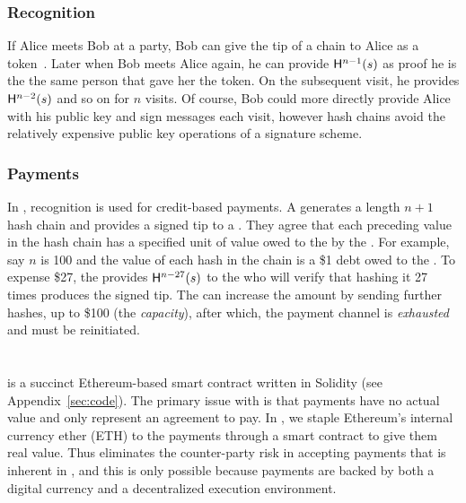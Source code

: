 \subsubsection{Recognition}

 If Alice meets Bob at a party, Bob can give the tip of a chain to Alice as a token~\cite{ABC+98}. Later when Bob meets Alice again, he can provide $\mathsf{H}^{n-1}(s)$ as proof he is the the same person that gave her the token. On the subsequent visit, he provides $\mathsf{H}^{n-2}(s)$ and so on for $n$ visits. Of course, Bob could more directly provide Alice with his public key and sign messages each visit, however hash chains avoid the relatively expensive public key operations of a signature scheme.

\subsubsection{Payments}

In \pw, recognition is used for credit-based payments. A \make generates a length $n+1$ hash chain and provides a signed tip to a \take. They agree that each preceding value in the hash chain has a specified unit of value owed to the \take by the \make. For example, say $n$ is 100 and the value of each hash in the chain is a \$1 debt owed to the \take. To expense \$27, the \make provides $\mathsf{H}^{n-27}(s)$ to the \take who will verify that hashing it 27 times produces the signed tip. The \make can increase the amount by sending further hashes, up to \$100 (the \textit{capacity}), after which, the payment channel is \textit{exhausted} and must be reinitiated.


\section{\ew}

\ew is a succinct Ethereum-based smart contract written in Solidity (see Appendix~\ref{sec:code}). The primary issue with \pw is that payments have no actual value and only represent an agreement to pay. In \ew, we staple Ethereum's internal currency ether (ETH) to the payments through a smart contract to give them real value. Thus \ew eliminates the counter-party risk in accepting payments that is inherent in \pw, and this is only possible because payments are backed by both a digital currency and a decentralized execution environment. 

